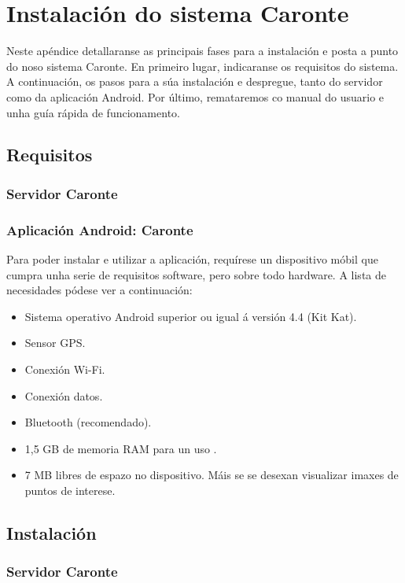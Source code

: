 \chapter{Instalación do sistema Caronte}

Neste apéndice detallaranse as principais fases para a instalación e posta a punto do noso sistema Caronte.
En primeiro lugar, indicaranse os requisitos do sistema. A continuación, os pasos para a súa instalación e despregue, tanto do servidor como da aplicación Android.
Por último, remataremos co manual do usuario e unha guía rápida de funcionamento.

\section{Requisitos}

\subsection{Servidor Caronte}
\subsection{Aplicación Android: Caronte}
Para poder instalar e utilizar a aplicación, requírese un dispositivo móbil que cumpra unha serie de requisitos software, pero sobre todo hardware. A lista de necesidades pódese ver a continuación:

\begin{itemize}
	\item Sistema operativo Android superior ou igual á versión 4.4 (Kit Kat).
	\item Sensor GPS.
	\item Conexión Wi-Fi.
	\item Conexión datos.
	\item Bluetooth (recomendado).
	\item 1,5 GB de memoria RAM para un uso .
	\item 7 MB libres de espazo no dispositivo. Máis se se desexan visualizar imaxes de puntos de interese.
\end{itemize}

\section{Instalación}

\subsection{Servidor Caronte}
